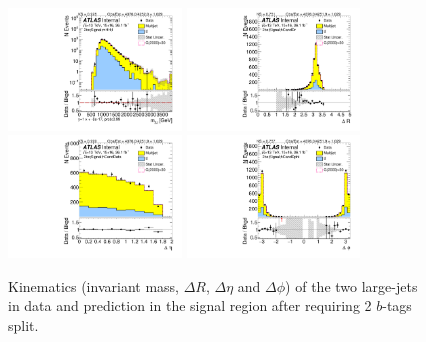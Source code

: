 \begin{figure}[htb!]
\begin{center}
\includegraphics[width=0.41\textwidth,angle=-90]{figures/boosted/Signal/b77_TwoTag_split_Signal_mHH_l_1.pdf}
\includegraphics[width=0.41\textwidth,angle=-90]{figures/boosted/Signal/b77_TwoTag_split_Signal_hCandDr.pdf}\\
\includegraphics[width=0.41\textwidth,angle=-90]{figures/boosted/Signal/b77_TwoTag_split_Signal_hCandDeta.pdf}
\includegraphics[width=0.41\textwidth,angle=-90]{figures/boosted/Signal/b77_TwoTag_split_Signal_hCandDphi.pdf}
  \caption{Kinematics (invariant mass, $\Delta R$, $\Delta \eta$ and $\Delta \phi$) of the two large-\R jets in data and prediction in the signal region after requiring 2 $b$-tags split.  }
  \label{fig:boosted-2bs-signal-ak10-system}
\end{center}
\end{figure}


\clearpage
